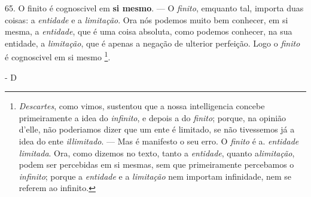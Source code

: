  65. O finito é cognoscivel em \textbf{si mesmo}. --- O \emph{finito}, emquanto tal, importa duas coisas: a \emph{entidade} e a \emph{limitação}. Ora nós podemos muito bem conhecer, em si mesma, a \emph{entidade}, que é uma coisa absoluta, como podemos conhecer, na sua entidade, a \emph{limitação}, que é apenas a negação de ulterior perfeição. Logo o \emph{finito} é cognoscivel em si mesmo \footnote{\emph{Descartes}, como vimos, sustentou que a nossa intelligencia concebe primeiramente a idea do \emph{infinito}, e depois a do \emph{finito}; porque, na opinião d'elle, não poderiamos dizer que um ente é limitado, se não tivessemos já a idea do ente \emph{illimitado}. --- Mas é manifesto o seu erro. O \emph{finito} é a. \emph{entidade limitada}. Ora, como dizemos no texto, tanto a \emph{entidade}, quanto a\emph{limitação}, podem ser percebidas em si mesmas, sem que primeiramente percebamos o \emph{infinito}; porque a \emph{entidade} e a \emph{limitação} nem importam infinidade, nem se referem ao infinito.}.

- D

